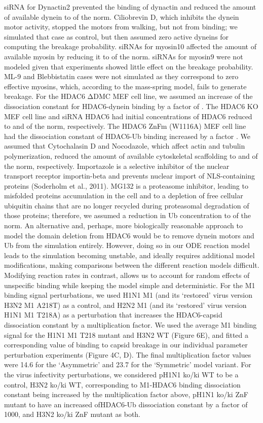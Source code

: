 siRNA for Dynactin2 prevented the binding of dynactin and reduced the amount of available dynein to   of the norm. Ciliobrevin D, which inhibits the dynein motor activity, stopped the motors from walking, but not from binding; we simulated that case as control, but then assumed zero active dyneins for computing the breakage probability. siRNAs for myosin10 affected the amount of available myosin by reducing it to   of the norm. siRNAs for myosin9 were not modeled given that experiments showed little effect on the breakage probability. ML-9 and Blebbistatin cases were not simulated as they correspond to zero effective myosins, which, according to the mass-spring model, fails to generate breakage. For the HDAC6 ΔDMC MEF cell line, we assumed an increase of the dissociation constant for HDAC6-dynein binding by a factor of  . The HDAC6 KO MEF cell line and siRNA HDAC6 had initial concentrations of HDAC6 reduced to   and   of the norm, respectively. The HDAC6 ZnFm (W1116A) MEF cell line had the dissociation constant of HDAC6-Ub binding increased by a factor  . We assumed that Cytochalasin D and Nocodazole, which affect actin and tubulin polymerization, reduced the amount of available cytoskeletal scaffolding to   and  of the norm, respectively. Importazole is a selective inhibitor of the nuclear transport receptor importin-beta and prevents nuclear import of NLS-containing proteins (Soderholm et al., 2011). MG132 is a proteasome inhibitor, leading to misfolded proteins accumulation in the cell and to a depletion of free cellular ubiquitin chains that are no longer recycled during proteasomal degradation of those proteins; therefore, we assumed a reduction in Ub concentration to   of the norm.
An alternative and, perhaps, more biologically reasonable approach to model the domain deletion from HDAC6 would be to remove dynein motors and Ub from the simulation entirely. However, doing so in our ODE reaction model leads to the simulation becoming unstable, and ideally requires additional model modifications, making comparisons between the different reaction models difficult. Modifying reaction rates in contrast, allows us to account for random effects of unspecific binding while keeping the model simple and deterministic.
For the M1 binding signal perturbations, we used H1N1 M1 (and its ‘restored’ virus version H3N2 M1 A218T) as a control, and H2N2 M1 (and its ‘restored’ virus version H1N1 M1 T218A) as a perturbation that increases the HDAC6-capsid dissociation constant by a multiplication factor. We used the average M1 binding signal for the H1N1 M1 T218 mutant and H3N2 WT (Figure 6E), and fitted a corresponding value of binding to capsid breakage in our individual parameter perturbation experiments (Figure 4C, D). The final multiplication factor values were 14.6 for the ‘Asymmetric’ and 23.7 for the ‘Symmetric’ model variant.
For the virus infectivity perturbations, we considered pH1N1 ko/ki WT to be a control, H3N2 ko/ki WT, corresponding to M1-HDAC6 binding dissociation constant being increased by the multiplication factor above, pH1N1 ko/ki ZnF mutant to have an increased ofHDAC6-Ub dissociation constant by a factor of 1000, and H3N2 ko/ki ZnF mutant as both.
